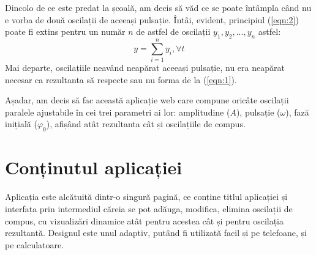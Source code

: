\documentclass[numbers=endperiod]{scrreprt}
\newcommand{\ifig}[1]{
  \begin{figure}[h!]
    \fbox{\texttt{[image: \#1]}}
  \end{figure}
}
\begin{document}
Dincolo de ce este predat la școală, am decis să văd ce se poate întâmpla când nu e vorba de două oscilații de aceeași pulsație. Întâi, evident, principiul (\ref{eqn:2}) poate fi extins pentru un număr $n$ de astfel de oscilații $y_1, y_2,...,y_n$ astfel:
\begin{equation}
\label{eqn:3}
y = \sum_{i=1}^{n}y_i ,\forall t 
\end{equation}
Mai departe, oscilațiile neavând neapărat aceeași pulsație, nu era neapărat necesar ca rezultanta să respecte sau nu forma de la (\ref{eqn:1}).

Așadar, am decis să fac această aplicație web care compune oricâte oscilații paralele ajustabile în cei trei parametri ai lor: amplitudine ($A$), pulsație ($\omega$), fază inițială ($\varphi_0$), afișând atât rezultanta cât și oscilațiile de compus.
\chapter{Conținutul aplicației}
\ifig{biosc1}
\begin{figure}[ht]
  \centering
\end{figure}
Aplicația este alcătuită dintr-o singură pagină, ce conține titlul aplicației și interfața prin intermediul căreia se pot adăuga, modifica, elimina oscilații de compus, cu vizualizări dinamice atât pentru acestea cât și pentru oscilația rezultantă. Designul este unul adaptiv, putând fi utilizată facil și pe telefoane, și pe calculatoare.
\end{document}
